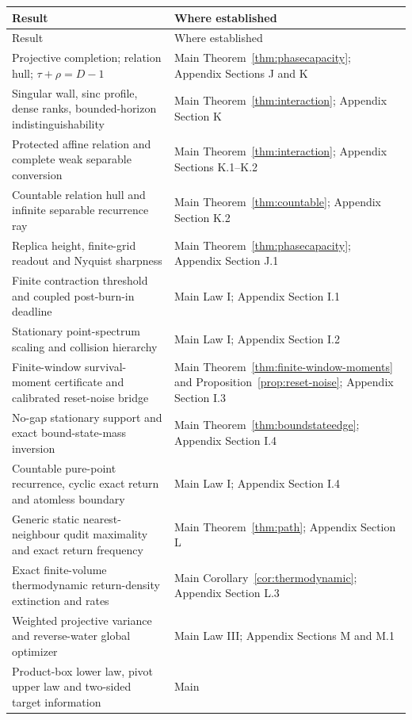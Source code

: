 \begin{longtable}{@{}>{\raggedright\arraybackslash}p{}
  >{\raggedright\arraybackslash}p{}@{}}
\toprule
Result & Where established \\
\midrule
\endfirsthead
\toprule
Result & Where established \\
\midrule
\endhead
Projective completion; relation hull; $\tau+\rho=D-1$ & Main
Theorem~\ref{thm:phasecapacity}; Appendix Sections J and K \\
Singular wall, sinc profile, dense ranks, bounded-horizon indistinguishability
& Main Theorem~\ref{thm:interaction}; Appendix Section K \\
Protected affine relation and complete weak separable conversion & Main
Theorem~\ref{thm:interaction}; Appendix Sections K.1--K.2 \\
Countable relation hull and infinite separable recurrence ray & Main
Theorem~\ref{thm:countable}; Appendix Section K.2 \\
Replica height, finite-grid readout and Nyquist sharpness & Main
Theorem~\ref{thm:phasecapacity}; Appendix Section J.1 \\
Finite contraction threshold and coupled post-burn-in deadline & Main Law I;
Appendix Section I.1 \\
Stationary point-spectrum scaling and collision hierarchy & Main Law I;
Appendix Section I.2 \\
Finite-window survival-moment certificate and calibrated reset-noise bridge &
Main Theorem~\ref{thm:finite-window-moments} and
Proposition~\ref{prop:reset-noise}; Appendix Section I.3 \\
No-gap stationary support and exact bound-state-mass inversion & Main
Theorem~\ref{thm:boundstateedge}; Appendix Section I.4 \\
Countable pure-point recurrence, cyclic exact return and atomless boundary &
Main Law I; Appendix Section I.4 \\
Generic static nearest-neighbour qudit maximality and exact return frequency &
Main Theorem~\ref{thm:path}; Appendix Section L \\
Exact finite-volume thermodynamic return-density extinction and rates & Main
Corollary~\ref{cor:thermodynamic}; Appendix Section L.3 \\
Weighted projective variance and reverse-water global optimizer & Main Law
III; Appendix Sections M and M.1 \\
Product-box lower law, pivot upper law and two-sided target information & Main

\end{longtable}
